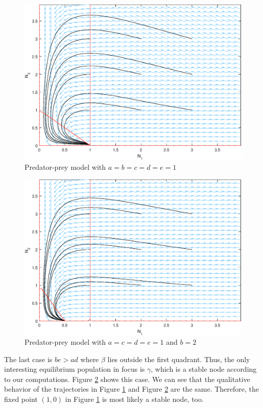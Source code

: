 \documentclass[11pt,a4paper]{scrartcl}
\theoremstyle{definition}
\begin{document}
\begin{figure}[h]
	\centering
	\includegraphics[scale=0.6]{nBeta_NonIsolated.eps}
	\caption{Predator-prey model with $a=b=c=d=e=1$}
	\label{fig5}
\end{figure}

\begin{figure}[h]
	\centering
	\includegraphics[scale=0.6]{nGamma_StableNode.eps}
	\caption{Predator-prey model with $a=c=d=e=1$ and $b=2$}
	\label{fig6}
\end{figure}

The last case is $be>ad$ where $\beta$ lies outside the first quadrant. Thus, the only interesting equilibrium population in focus is $\gamma$, which is a stable node according to our computations. Figure \ref{fig6} shows this case. We can see that the qualitative behavior of the trajectories in Figure \ref{fig5} and Figure \ref{fig6} are the same. Therefore, the fixed point $(1,0)$ in Figure \ref{fig5} is most likely a stable node, too.
\newline
\end{document}

